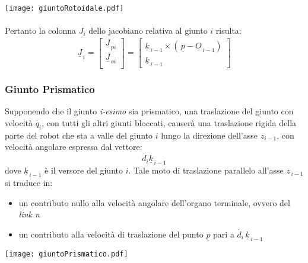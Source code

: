 \begin{center}
\texttt{[image: giuntoRotoidale.pdf]}
\end{center}

\paragraph{}
Pertanto la colonna $\underline{J_i}$ dello jacobiano relativa al giunto $i$ risulta:
\begin{equation} \label{J_rotoidale}
	\underline{J}_{\,i} = 
	\begin{bmatrix}
		\underline{J}_{\,pi} \\
		\underline{J}_{\,oi} \\
	\end{bmatrix}
	= 
	\begin{bmatrix}
		\underline{k}_{\,i-1} \times (\,\underline{p} - \underline{O}_{\,i-1}) \\
		\underline{k}_{\,i-1}
	\end{bmatrix}
\end{equation}

\subsubsection{Giunto Prismatico}
Supponendo che il giunto \emph{i-esimo} sia prismatico, una traslazione del giunto con velocità $\dot{q_i}$, con tutti gli altri giunti bloccati, causerà una traslazione rigida della parte del robot che sta a valle del giunto $i$ lungo la direzione dell'asse $z_{i-1}$, con velocità angolare espressa dal vettore:
\begin{equation}
	\dot{d_i}\underline{k}_{\,i-1}
\end{equation}
dove $\underline{k}_{\,i-1}$ è il versore del giunto $i$. Tale moto di traslazione parallelo all'asse $z_{\,i-1}$ si traduce in:
\begin{itemize}
	\item un contributo nullo alla velocità angolare dell'organo terminale, ovvero del \emph{link n}
	\item un contributo alla velocità di traslazione del punto $\underline{p}$ pari a $\dot{d_i}\,\underline{k}_{\,i-1}$
\end{itemize}

\begin{center}
\texttt{[image: giuntoPrismatico.pdf]}
\end{center}

